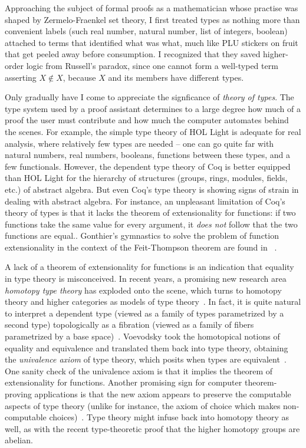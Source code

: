 \documentclass{llncs}
\begin{document}
Approaching the subject of formal proofs as a mathematician whose
practise was shaped by Zermelo-Fraenkel set theory, I first treated
types as nothing more than convenient labels (such real number,
natural number, list of integers, boolean) attached to terms that
identified what was what, much like PLU stickers on fruit that get
peeled away before consumption.  I recognized that they saved higher-order
logic from Russell's paradox, since one cannot form a well-typed term
asserting $X \not\in X$, because $X$ and its members have different
types.

Only gradually have I come to appreciate the signficance of {\it
  theory of types}.  The type system used by a proof assistant
determines to a large degree how much of a proof the user must
contribute and how much the computer automates behind the scenes.  For
example, the simple type theory of HOL Light is adequate for real
analysis, where relatively few types are needed -- one can go quite
far with natural numbers, real numbers, booleans, functions between
these types, and a few functionals.  However, the dependent type
theory of Coq is better equipped than HOL Light for the hierarchy of
structures (groups, rings, modules, fields, etc.) of abstract algebra.
But even Coq's type theory is showing signs of strain in dealing with
abstract algebra.  For instance, an unpleasant limitation of Coq's
theory of types is that it lacks the theorem of extensionality for
functions: if two functions take the same value for every argument, it
{\it does not} follow that the two functions are equal.\cite{HOL Light
  posits three mathematical axioms: function extensionality, choice,
  and infinity.}.  Gonthier's gymnastics to solve the problem of
function extensionality in the context of the Feit-Thompson theorem
are found in ~\cite{XX}.

A lack of a theorem of extensionality for functions is an indication
that equality in type theory is misconceived.  In recent years, a
promising new research area {\it homotopy type theory} has exploded
onto the scene, which turns to homotopy theory and higher categories
as models of type theory~\cite{htt}.  In fact, it is quite natural to
interpret a dependent type (viewed as a family of types parametrized
by a second type) topologically as a fibration (viewed as a family of
fibers parametrized by a base space)~\cite{AW09}. Voevodsky took the
homotopical notions of equality and equivalence and translated them
back into type theory, obtaining the {\it univalence axiom} of type
theory, which posits when types are equivalent~\cite{VV11}.  One
sanity check of the univalence axiom is that it implies the theorem of
extensionality for functions.  Another promising sign for computer
theorem-proving applications is that the new axiom appears to preserve
the computable aspects of type theory (unlike for instance, the axiom
of choice which makes non-computable choices)~\cite{LH11}.  Type
theory might infuse back into homotopy theory as well, as with the
recent type-theoretic proof that the higher homotopy groups are
abelian.
\end{document}
